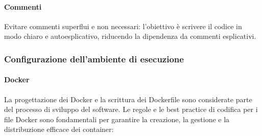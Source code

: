 \documentclass{article}
\begin{document}
\paragraph{Commenti}
Evitare commenti superflui e non necessari: l'obiettivo è scrivere il codice in modo chiaro e autoesplicativo, riducendo la dipendenza da commenti esplicativi. 
\subsubsection{Configurazione dell'ambiente di esecuzione}
\paragraph{Docker}

La progettazione dei Docker e la scrittura dei Dockerfile sono considerate parte del processo di sviluppo del software.
Le regole e le best practice di codifica per i file Docker sono fondamentali per garantire la creazione, la gestione e la distribuzione efficace dei container:
\end{document}
